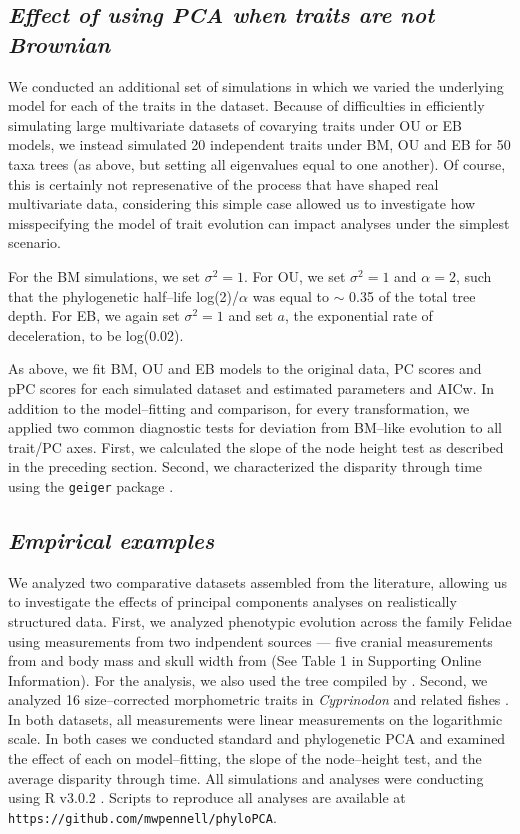 \documentclass[a4paper,12pt]{article}
\begin{document}

\subsection{\emph{Effect of using PCA when traits are not Brownian}}
We conducted an additional set of simulations in which we varied the underlying model for each of the traits in the dataset. Because of difficulties in efficiently simulating large multivariate datasets of covarying traits under OU or EB models, we instead simulated 20 independent traits under BM, OU and EB for 50 taxa trees (as above, but setting all eigenvalues equal to one another). Of course, this is certainly not represenative of the process that have shaped real multivariate data, considering this simple case allowed us to investigate how misspecifying the model of trait evolution can impact analyses under the simplest scenario.

For the BM simulations, we set $\sigma^2=\text{1}$. For OU, we set $\sigma^2=\text{1}$ and $\alpha=\text{2}$, such that the phylogenetic half--life log(2)/$\alpha$ \citep{Hansen2008} was equal to $\sim$ 0.35 of the total tree depth. For EB, we again set $\sigma^2=\text{1}$ and set $a$, the exponential rate of deceleration, to be log(0.02). 

As above, we fit BM, OU and EB models to the original data, PC scores and pPC scores for each simulated dataset and estimated parameters and AICw. In addition to the model--fitting and comparison, for every transformation, we applied two common diagnostic tests for deviation from BM--like evolution to all trait/PC axes. First, we calculated the slope of the node height test as described in the preceding section. Second, we characterized the disparity through time \citep{Harmon2003} using the \texttt{geiger} package \citep{geiger2}. 


\subsection{\emph{Empirical examples}}
We analyzed two comparative datasets assembled from the literature, allowing us to investigate the effects of principal components analyses on realistically structured data. First, we analyzed phenotypic evolution across the family Felidae using measurements from two indpendent sources --- five cranial measurements from \cite{slater_2009} and body mass and skull width from \cite{sakamoto_2010} (See Table 1 in Supporting Online Information). For the analysis, we also used the tree compiled by \cite{sakamoto_2010}. Second, we analyzed 16 size--corrected morphometric traits in \textit{Cyprinodon} and related fishes \citep{Martin2011}. In both datasets, all measurements were linear measurements on the logarithmic scale. In both cases we conducted standard and phylogenetic PCA and examined the effect of each on model--fitting, the slope of the node--height test, and the average disparity through time. All simulations and analyses were conducting using R v3.0.2 \citep{R}. Scripts to reproduce all analyses are available at \texttt{https://github.com/mwpennell/phyloPCA}.
  
\end{document}
